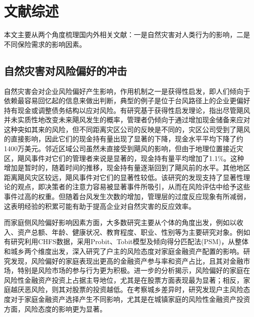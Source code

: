 \section{文献综述}

本文主要从两个角度梳理国内外相关文献：一是自然灾害对人类行为的影响，二是不同保险需求的影响因素。

\subsection{自然灾害对风险偏好的冲击}

自然灾害会对企业风险偏好产生影响，作用机制之一是获得性启发\citep{tversky1973availability}，即人们倾向于依赖最容易回忆起的信息来做出判断，典型的例子是位于台风路径上的企业更偏好持有现金\citep{杨娜娜2019自然灾害与企业现金持有}或调整债务结构\citep{shao2024typhoons}以应对风险。有研究基于获得性启发理论\citep{0Do}，指出尽管飓风并未实质性地改变未来飓风发生的概率，管理者仍倾向于通过增加现金储备来应对这种突如其来的风险，但不同距离灾区公司的反映是不同的，灾区公司受到了飓风的直接影响，因此它们的现金持有量出现了显著的下降，现金水平平均下降了约1400万美元。邻近区域公司虽然未直接受到飓风的影响，但由于地理位置接近灾区，飓风事件对它们的管理者来说是显著的，现金持有量平均增加了1.1\%。这种增加是暂时的，随着时间的推移，现金持有量逐渐回到了飓风前的水平。其他地区距离飓风灾区较远，飓风事件对它们的显著性较低。该研究的发现支持了显著性理论的观点，即决策者的注意力容易被显著事件所吸引，从而在风险评估中给予这些事件过高的权重。但随着台风发生次数的增加，管理层的过度反应现象有所减弱，这表明经验的积累可能有助于提高企业对自然灾害的反应效率。

而家庭侧风险偏好影响因素方面，大多数研究主要从个体的角度出发，例如以收入\citep{石双2018收入与风险偏好}、资产总额\citep{卢亚娟殷君瑶2021户主风险态度对家庭金融资产配置的影响研究}、年龄\citep{王晶2021年龄结构}、健康状况\citep{雷晓燕2010中国家庭的资产组合选择}、教育程度\citep{梁立俊2018受教育程度与主客观风险偏好}、职业\citep{赵颖2017中国劳动者的风险偏好与职业选择}、性别\citep{徐小华2019女性劳动参与会影响家庭资产配置风险偏好吗}等为主要研究对象。例如有研究利用CHFS数据，采用Probit、Tobit模型及倾向得分匹配法(PSM)，从整体和城乡两个维度出发，深入研究了户主的风险态度对家庭金融资产配置的影响\citep{卢亚娟殷君瑶2021户主风险态度对家庭金融资产配置的影响研究}。研究发现，风险偏好的家庭表现出更高的金融资产参与率和资产占比，且其对金融市场，特别是风险市场的参与行为更为积极。进一步的分析揭示，风险偏好的家庭在风险性金融资产投资上占据主导地位，尤其是在股票方面表现最为显著；相反，家庭越厌恶风险，则其对股票的投资越低。在考察城乡差异时，研究发现户主风险态度对于家庭金融资产选择产生不同影响，尤其是在城镇家庭的风险性金融资产投资方面，风险态度的影响更为显著。

